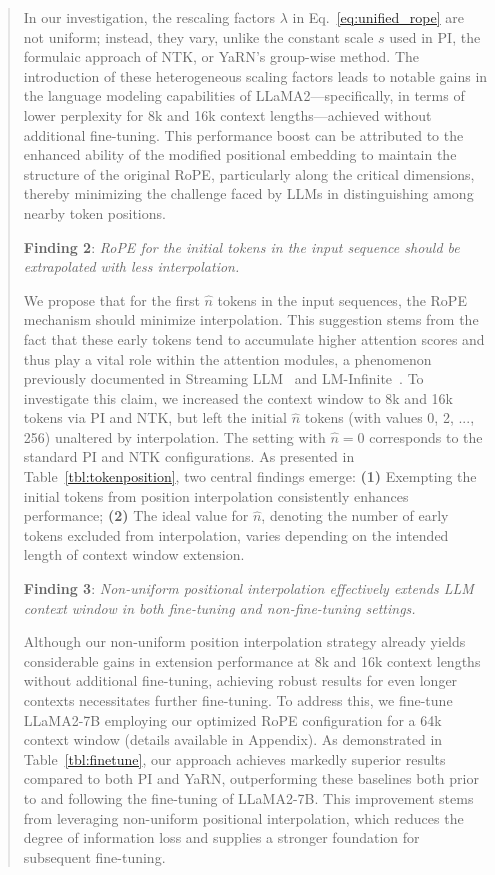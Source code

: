 \begin{abstract}
In our investigation, the rescaling factors $\lambda$ in Eq.~\ref{eq:unified_rope} are not uniform; instead, they vary, unlike the constant scale $s$ used in PI, the formulaic approach of NTK, or YaRN's group-wise method. The introduction of these heterogeneous scaling factors leads to notable gains in the language modeling capabilities of LLaMA2—specifically, in terms of lower perplexity for 8k and 16k context lengths—achieved without additional fine-tuning. This performance boost can be attributed to the enhanced ability of the modified positional embedding to maintain the structure of the original RoPE, particularly along the critical dimensions, thereby minimizing the challenge faced by LLMs in distinguishing among nearby token positions.

\textbf{Finding 2}: \textit{RoPE for the initial tokens in the input sequence should be extrapolated with less interpolation.} 

We propose that for the first $\hat{n}$ tokens in the input sequences, the RoPE mechanism should minimize interpolation. This suggestion stems from the fact that these early tokens tend to accumulate higher attention scores and thus play a vital role within the attention modules, a phenomenon previously documented in Streaming LLM~\cite{streamingllm} and LM-Infinite~\cite{han2023lminfinite}. To investigate this claim, we increased the context window to 8k and 16k tokens via PI and NTK, but left the initial $\hat{n}$ tokens (with values 0, 2, ..., 256) unaltered by interpolation. The setting with $\hat{n}=0$ corresponds to the standard PI and NTK configurations. As presented in Table~\ref{tbl:tokenposition}, two central findings emerge: \textbf{(1)} Exempting the initial tokens from position interpolation consistently enhances performance; \textbf{(2)} The ideal value for $\hat{n}$, denoting the number of early tokens excluded from interpolation, varies depending on the intended length of context window extension.

\textbf{Finding 3}: \textit{Non-uniform positional interpolation effectively extends LLM context window in both fine-tuning and non-fine-tuning settings.} 

Although our non-uniform position interpolation strategy already yields considerable gains in extension performance at 8k and 16k context lengths without additional fine-tuning, achieving robust results for even longer contexts necessitates further fine-tuning. To address this, we fine-tune LLaMA2-7B employing our optimized RoPE configuration for a 64k context window (details available in Appendix). As demonstrated in Table~\ref{tbl:finetune}, our approach achieves markedly superior results compared to both PI and YaRN, outperforming these baselines both prior to and following the fine-tuning of LLaMA2-7B. This improvement stems from leveraging non-uniform positional interpolation, which reduces the degree of information loss and supplies a stronger foundation for subsequent fine-tuning.


\end{abstract}
